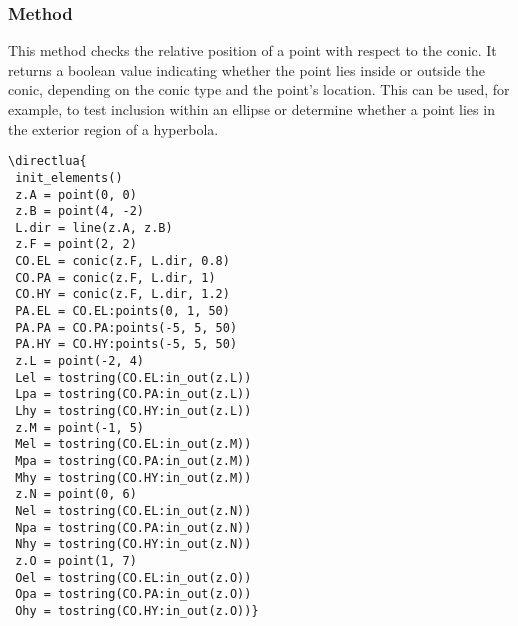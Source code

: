 \subsubsection{Method } %
\label{ssub:method_conic_in_out}

This method checks the relative position of a point with respect to the conic.
It returns a boolean value indicating whether the point lies inside or outside the conic, depending on the conic type and the point's location.
This can be used, for example, to test inclusion within an ellipse or determine whether a point lies in the exterior region of a hyperbola.

\vspace{1em}

\begin{minipage}{.5\textwidth}
\begin{verbatim}
\directlua{
 init_elements()
 z.A = point(0, 0)
 z.B = point(4, -2)
 L.dir = line(z.A, z.B)
 z.F = point(2, 2)
 CO.EL = conic(z.F, L.dir, 0.8)
 CO.PA = conic(z.F, L.dir, 1)
 CO.HY = conic(z.F, L.dir, 1.2)
 PA.EL = CO.EL:points(0, 1, 50)
 PA.PA = CO.PA:points(-5, 5, 50)
 PA.HY = CO.HY:points(-5, 5, 50)
 z.L = point(-2, 4)
 Lel = tostring(CO.EL:in_out(z.L))
 Lpa = tostring(CO.PA:in_out(z.L))
 Lhy = tostring(CO.HY:in_out(z.L))
 z.M = point(-1, 5)
 Mel = tostring(CO.EL:in_out(z.M))
 Mpa = tostring(CO.PA:in_out(z.M))
 Mhy = tostring(CO.HY:in_out(z.M))
 z.N = point(0, 6)
 Nel = tostring(CO.EL:in_out(z.N))
 Npa = tostring(CO.PA:in_out(z.N))
 Nhy = tostring(CO.HY:in_out(z.N))
 z.O = point(1, 7)
 Oel = tostring(CO.EL:in_out(z.O))
 Opa = tostring(CO.PA:in_out(z.O))
 Ohy = tostring(CO.HY:in_out(z.O))}
\end{verbatim}
\end{minipage}

